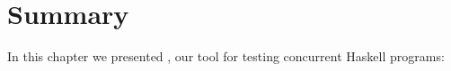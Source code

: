 







\vfill\pagebreak
\section{Summary}

In this chapter we presented \dejafu{}, our tool for testing
concurrent Haskell programs:

